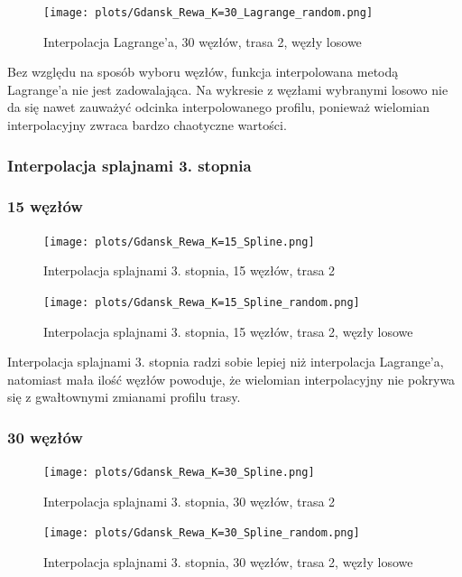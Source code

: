 \documentclass{article}
\begin{document}
\begin{figure}[H]
    \centering
    \texttt{[image: plots/Gdansk\_Rewa\_K=30\_Lagrange\_random.png]}
    \caption{Interpolacja Lagrange'a, 30 węzłów, trasa 2, węzły losowe}
\end{figure}

Bez względu na sposób wyboru węzłów, funkcja interpolowana metodą Lagrange'a nie jest zadowalająca.
Na wykresie z węzłami wybranymi losowo nie da się nawet zauważyć odcinka interpolowanego profilu,
ponieważ wielomian interpolacyjny zwraca bardzo chaotyczne wartości.

\subsubsection{Interpolacja splajnami 3. stopnia}

\subsubsection*{\hfil 15 węzłów \hfil }

\begin{figure}[H]
    \centering
    \texttt{[image: plots/Gdansk\_Rewa\_K=15\_Spline.png]}
    \caption{Interpolacja splajnami 3. stopnia, 15 węzłów, trasa 2}
\end{figure}

\begin{figure}[H]
    \centering
    \texttt{[image: plots/Gdansk\_Rewa\_K=15\_Spline\_random.png]}
    \caption{Interpolacja splajnami 3. stopnia, 15 węzłów, trasa 2, węzły losowe}
\end{figure}

Interpolacja splajnami 3. stopnia radzi sobie lepiej niż interpolacja Lagrange'a, 
natomiast mała ilość węzłów powoduje, że wielomian interpolacyjny nie pokrywa się
z gwałtownymi zmianami profilu trasy.

\subsubsection*{\hfil 30 węzłów \hfil }

\begin{figure}[H]
    \centering
    \texttt{[image: plots/Gdansk\_Rewa\_K=30\_Spline.png]}
    \caption{Interpolacja splajnami 3. stopnia, 30 węzłów, trasa 2}
\end{figure}

\begin{figure}[H]
    \centering
    \texttt{[image: plots/Gdansk\_Rewa\_K=30\_Spline\_random.png]}
    \caption{Interpolacja splajnami 3. stopnia, 30 węzłów, trasa 2, węzły losowe}
\end{figure}
\end{document}
